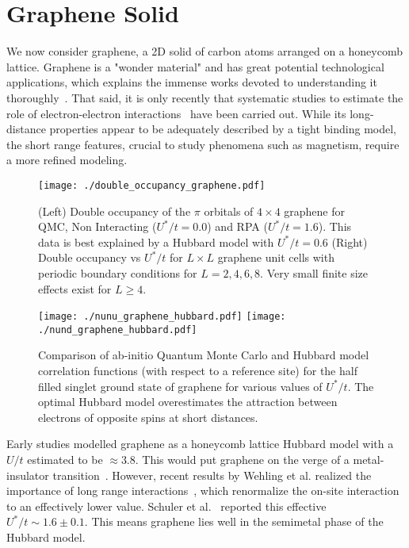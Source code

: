 \documentclass[aip,jcp,twocolumn,10pt]{revtex4-1}
\begin{document}
\section{Graphene Solid}
We now consider graphene, a 2D solid of carbon atoms arranged on a honeycomb lattice. 
Graphene is a "wonder material" and has great potential technological applications, 
which explains the immense works devoted to understanding it thoroughly~\cite{graphene_review}.
That said, it is only recently that systematic studies to estimate the role of 
electron-electron interactions~\cite{Wehling_graphene,Schuler_graphene,Abbamonte} 
have been carried out. While its long-distance properties appear to be adequately 
described by a tight binding model, the short range features, 
crucial to study phenomena such as magnetism, require a more refined modeling.

\begin{figure}[htpb]
\centering
\texttt{[image: ./double\_occupancy\_graphene.pdf]}
\caption{(Left) Double occupancy of the $\pi$ orbitals of $4\times4$ graphene for QMC, Non Interacting ($U^{*}/t = 0.0 $) 
and RPA ($U^{*}/t=1.6$). This data is best explained by a Hubbard model with $U^{*}/t=0.6$ 
(Right) Double occupancy vs $U^{*}/t$ for $L \times L$ graphene unit cells with periodic boundary conditions for $L=2,4,6,8$.
Very small finite size effects exist for $L \geq 4$.}
\label{fig:doubleocc} 
\end{figure}	

\begin{figure*}[htpb]
\centering
\texttt{[image: ./nunu\_graphene\_hubbard.pdf]}
\texttt{[image: ./nund\_graphene\_hubbard.pdf]}
\caption{Comparison of ab-initio Quantum Monte Carlo 
and Hubbard model correlation functions (with respect to a reference site) 
for the half filled singlet ground state of graphene 
for various values of $U^{*}/t$. The optimal Hubbard model overestimates 
the attraction between electrons of opposite spins at short distances.}
\label{fig:corrs_graphene} 
\end{figure*}	

Early studies modelled graphene as a honeycomb lattice Hubbard model 
with a $U/t$ estimated to be $ \approx 3.8$. This would put graphene on the verge of a 
metal-insulator transition~\cite{Sorella_Tosatti, Sorella_Nature}. 
However, recent results by Wehling et al. realized the importance of 
long range interactions~\cite{Wehling_graphene},
which renormalize the on-site interaction to an effectively lower value. 
Schuler et al.~\cite{Schuler_graphene} reported this effective $U^{*}/t \sim 1.6 \pm 0.1$. 
This means graphene lies well in the semimetal phase of the Hubbard model. 
\end{document}
